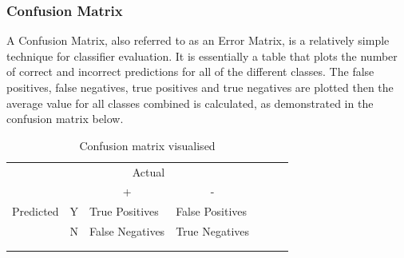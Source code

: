 \documentclass[12pt]{report}
\begin{document}
\subsubsection{Confusion Matrix}
\begin{flushleft}
A Confusion Matrix, also referred to as an Error Matrix, is a relatively simple technique for classifier evaluation. It is essentially a table that plots the number of correct and incorrect predictions for all of the different classes. The false positives, false negatives, true positives and true negatives are plotted then the average value for all classes combined is calculated, as demonstrated in the confusion matrix below.

\begin{table}[ht!]
\begin{tabular}{lllllll}
          &                        & \multicolumn{1}{r}{Actual}           &                                      &  &  &  \\
          &                        & \multicolumn{1}{c}{+}                & \multicolumn{1}{c}{-}                &  &  &  \\ \cline{3-4}
Predicted & \multicolumn{1}{l|}{Y} & \multicolumn{1}{l|}{True Positives}  & \multicolumn{1}{l|}{False Positives} &  &  &  \\ \cline{3-4}
          & \multicolumn{1}{l|}{N} & \multicolumn{1}{l|}{False Negatives} & \multicolumn{1}{l|}{True Negatives}  &  &  &  \\ \cline{3-4}
          &                        &                                      &                                      &  &  &  \\
          &                        &                                      &                                      &  &  & 
\end{tabular}
\caption{Confusion matrix visualised}
\end{table}
\end{flushleft}
\end{document}
